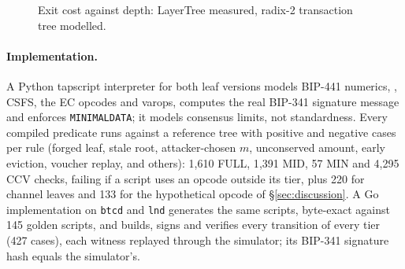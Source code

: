 
\iffullversion\else
\begin{figure}[t]
\centering
{}
\caption{Exit cost against depth: LayerTree measured, radix-2 transaction tree modelled.}
\label{fig:plot}
\end{figure}
\fi

\iffullversion
\paragraph{Implementation.} A Python tapscript interpreter for both leaf
versions models BIP-441 numerics, , CSFS, the EC opcodes and
varops, computes the real BIP-341 signature message and enforces
\texttt{MINIMALDATA}; it models consensus limits, not standardness.
Every compiled predicate runs against a reference tree with positive and
negative cases per rule (forged leaf, stale root, attacker-chosen $m$,
unconserved amount, early eviction, voucher replay, and others): 1{,}610
FULL, 1{,}391 MID, 57 MIN and 4{,}295 CCV checks, failing if a script uses an
opcode outside its tier, plus 220 for channel leaves and 133 for the
hypothetical opcode of \S\ref{sec:discussion}. A Go implementation on
\texttt{btcd} and \texttt{lnd} generates the same scripts, byte-exact
against 145 golden scripts, and builds, signs and verifies every
transition of every tier (427 cases), each witness replayed through the
simulator; its BIP-341 signature hash equals the simulator's.
\else
